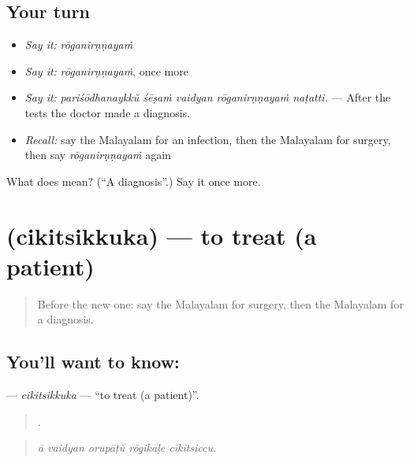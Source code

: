 \subsection*{Your turn}
\begin{itemize}
\raggedright
  \item \emph{Say it:} \emph{rōganirṇṇayaṁ}
  \item \emph{Say it:} \emph{rōganirṇṇayaṁ}, once more
  \item \emph{Say it:} \emph{pariśōdhanaykkŭ śēṣaṁ vaidyan rōganirṇṇayaṁ naṭatti.} — After the tests the doctor made a diagnosis.
  \item \emph{Recall:} say the Malayalam for an infection, then the Malayalam for surgery, then say \emph{rōganirṇṇayaṁ} again
\end{itemize}

\begin{tcolorbox}[breakable,colback=teal!4,colframe=teal!35!black,title={Before you move on}]
What does  mean? (\textquotedblleft{}A diagnosis\textquotedblright{}.) Say it once more.
\end{tcolorbox}
\section[\texorpdfstring{\ml{ചികിത്സിക്കുക} (cikitsikkuka)}{ചികിത്സിക്കുക (cikitsikkuka)}]{ (cikitsikkuka) — to treat (a patient)}

\label{lesson:ML-C532-cikitsikkuka}



\begin{quote}
Before the new one: say the Malayalam for surgery, then the Malayalam for a diagnosis.
\end{quote}

\subsection*{You'll want to know: }
\textbf{} — \emph{cikitsikkuka} — \textquotedblleft{}to treat (a patient)\textquotedblright{}.

\begin{quote}
    .
\end{quote}

\begin{quote}
\emph{ā vaidyan orupāṭŭ rōgikaḷe cikitsiccu.}
\end{quote}

